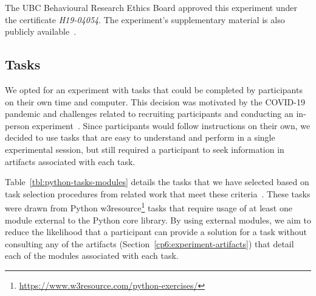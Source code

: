 





The \acs{UBC} Behavioural Research Ethics Board approved this experiment under the certificate \textit{H19-04054}.
The experiment's supplementary material is also publicly available~\cite{cp6_supplementary_material}.



\subsection{Tasks}
\label{cp6:tasks}


We opted for an experiment with tasks that could be completed by participants on their own time and computer.
This decision was motivated by the COVID-19 pandemic and challenges related to recruiting participants and conducting an in-person experiment~\cite{russo2021a, russo2021b}. 
Since participants would follow instructions on their own, we decided to use tasks that are easy to understand and perform in a single experimental session, but still required a participant  
to seek information in artifacts associated with each task.


Table~\ref{tbl:python-tasks-modules} details the tasks that we have selected based on task selection procedures from related work that meet these criteria~\cite{thiselton2019}. 
These tasks were drawn from
Python w3resource\footnote{\url{https://www.w3resource.com/python-exercises/}} tasks
that require usage of at least one module external to the Python core library.
By using external modules, we aim to reduce the likelihood that a participant 
can provide a solution for a task without consulting any of the artifacts (Section~\ref{cp6:experiment-artifacts})
that detail each of the modules associated with each task. 


